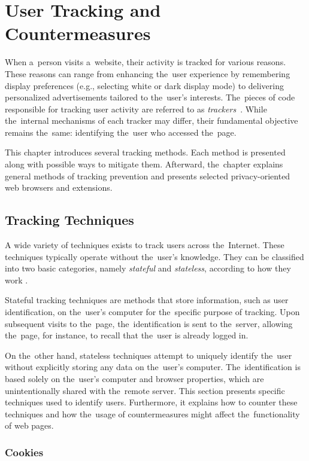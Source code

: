 \chapter{User Tracking and Countermeasures}
\label{chapter-2}
When a~person visits a~website, their activity is tracked for various reasons. These reasons can range from enhancing the~user experience by remembering display preferences (e.g., selecting white or dark display mode) to delivering personalized advertisements tailored to the~user's interests. The~pieces of code responsible for tracking user activity are referred to as \textit{trackers}~\cite{brave-trackers}. While the~internal mechanisms of each tracker may differ, their fundamental objective remains the~same: identifying the~user who accessed the~page.

This chapter introduces several tracking methods. Each method is presented along with possible ways to mitigate them. Afterward, the~chapter explains general methods of tracking prevention and presents selected privacy-oriented web browsers and extensions.

\section{Tracking Techniques}
\label{specific-techniques}

A wide variety of techniques exists to track users across the~Internet. These techniques typically operate without the~user's knowledge. They can be classified into two basic categories, namely \textit{stateful} and \textit{stateless}, according to how they work \cite{fingerprinting-survey}.

Stateful tracking techniques are methods that store information, such as user identification, on the~user's computer for the~specific purpose of tracking. Upon subsequent visits to the~page, the~identification is sent to the~server, allowing the~page, for instance, to recall that the~user is already logged in. 

On the~other hand, stateless techniques attempt to uniquely identify the~user without explicitly storing any data on the~user's computer. The~identification is based solely on the~user's computer and browser properties, which are unintentionally shared with the~remote server. This section presents specific techniques used to identify users. Furthermore, it explains how to counter these techniques and how the~usage of countermeasures might affect the~functionality of web pages.


\subsection{Cookies}
\label{cookies-section}

